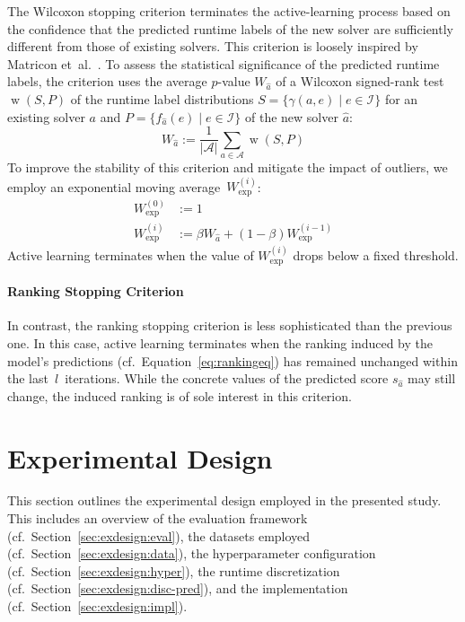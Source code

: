 \documentclass[sn-basic, Numbered]{sn-jnl} %
\begin{document}
The Wilcoxon stopping criterion terminates the active-learning process based on the confidence that the predicted runtime labels of the new solver are sufficiently different from those of existing solvers.
This criterion is loosely inspired by Matricon et~al.~\cite{MatriconAFSH21}.
To assess the statistical significance of the predicted runtime labels, the criterion uses the average $p$-value $W_{\hat{a}}$ of a Wilcoxon signed-rank test $\operatorname{w}(S,P)$ of the runtime label distributions ${S=\{ \gamma(a, e) \mid e \in \mathcal{I} \}}$ for an existing solver $a$ and \mbox{$P=\{ f_{\hat a}(e) \mid e \in \mathcal{I} \}$} of the new solver $\hat{a}$:
%
\begin{equation*}
  W_{\hat{a}} := \frac{1}{\lvert \mathcal{A} \rvert} \sum_{a \in \mathcal{A}} \operatorname{w}(S, P)
\end{equation*}
%
To improve the stability of this criterion and mitigate the impact of outliers, we employ an exponential moving average~$W^{(i)}_{\exp}$:
%
\begin{align*}
  W_{\exp}^{\left(0\right)} &:= 1\\
  W_{\exp}^{\left(i\right)} &:= \beta W_{\hat{a}} + \left(1 - \beta\right) W_{\exp}^{\left(i - 1\right)}
\end{align*}
%
Active learning terminates when the value of $W^{(i)}_{\exp}$ drops below a fixed threshold.

\paragraph{Ranking Stopping Criterion}

In contrast, the ranking stopping criterion is less sophisticated than the previous one.
In this case, active learning terminates when the ranking induced by the model's predictions (cf.~Equation~\eqref{eq:rankingeq}) has remained unchanged within the last~$l$~iterations.
While the concrete values of the predicted score $s_{\hat a}$ may still change, the induced ranking is of sole interest in this criterion.

\section{Experimental Design}
\label{sec:exdesign}

This section outlines the experimental design employed in the presented study.
This includes an overview of the evaluation framework (cf.~Section~\ref{sec:exdesign:eval}), the datasets employed (cf.~Section~\ref{sec:exdesign:data}), the hyperparameter configuration (cf.~Section~\ref{sec:exdesign:hyper}), the runtime discretization (cf.~Section~\ref{sec:exdesign:disc-pred}), and the implementation (cf.~Section~\ref{sec:exdesign:impl}).
\end{document}
